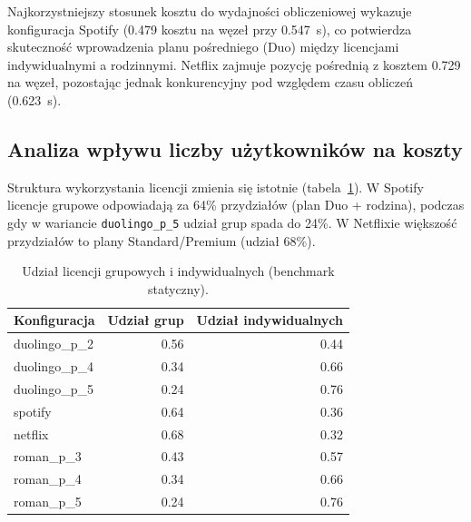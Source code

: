 Najkorzystniejszy stosunek kosztu do wydajności obliczeniowej wykazuje konfiguracja Spotify (0.479 kosztu na węzeł przy 0.547~s), co potwierdza skuteczność wprowadzenia planu pośredniego (Duo) między licencjami indywidualnymi a rodzinnymi. Netflix zajmuje pozycję pośrednią z kosztem 0.729 na węzeł, pozostając jednak konkurencyjny pod względem czasu obliczeń (0.623~s).

\subsection{Analiza wpływu liczby użytkowników na koszty}

Struktura wykorzystania licencji zmienia się istotnie (tabela~\ref{tab:ext-license-mix}). W Spotify licencje grupowe odpowiadają za 64\% przydziałów (plan Duo + rodzina), podczas gdy w wariancie \texttt{duolingo\_p\_5} udział grup spada do 24\%. W Netflixie większość przydziałów to plany Standard/Premium (udział 68\%).

\begin{table}[H]
    \centering
    \caption{Udział licencji grupowych i indywidualnych (benchmark statyczny).}
    \label{tab:ext-license-mix}
    \begin{tabular}{lrr}
        \toprule
        \textbf{Konfiguracja} & \textbf{Udział grup} & \textbf{Udział indywidualnych} \\
        \midrule
        duolingo\_p\_2        & 0.56                 & 0.44                           \\
        duolingo\_p\_4        & 0.34                 & 0.66                           \\
        duolingo\_p\_5        & 0.24                 & 0.76                           \\
        spotify               & 0.64                 & 0.36                           \\
        netflix               & 0.68                 & 0.32                           \\
        roman\_p\_3           & 0.43                 & 0.57                           \\
        roman\_p\_4           & 0.34                 & 0.66                           \\
        roman\_p\_5           & 0.24                 & 0.76                           \\
        \bottomrule
    \end{tabular}
\end{table}



